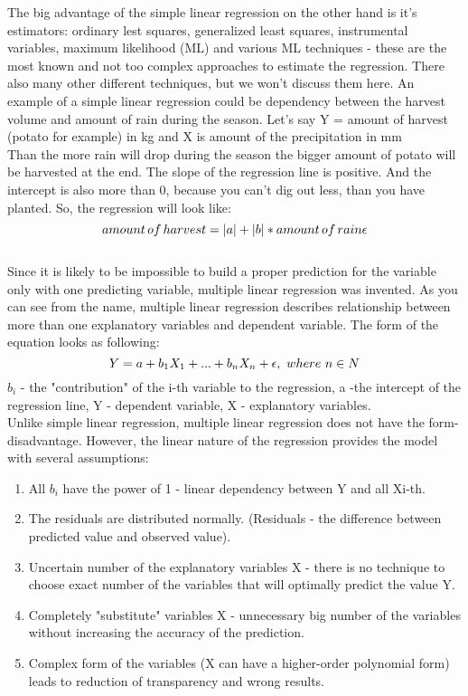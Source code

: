 \documentclass[12pt, a4paper]{article}
\begin{document}
The big advantage of the simple linear regression on the other hand is it's estimators: ordinary lest squares, generalized least squares, instrumental variables, maximum likelihood (ML) and various ML techniques - these are the most known and not too complex approaches to estimate the regression. There also many other different techniques, but we won't discuss them here. An example of a simple linear regression could be dependency between the harvest volume and amount of rain during the season. Let's say Y = amount of harvest (potato for example) in kg and X is amount of the precipitation in mm\\ Than the more rain will drop during the season the bigger amount of potato will be harvested at the end. The slope of the regression line is positive. And the intercept is also more than 0, because you can't dig out less, than you have planted. So, the regression will look like:
\[amount \thinspace of \thinspace harvest = |a| + |b|*amount \thinspace of \thinspace rain \epsilon\] \\
Since it is likely to be impossible to build a proper prediction for the variable only with one predicting variable, multiple linear regression was invented. As you can see from the name, multiple linear regression describes relationship between more than one explanatory variables and dependent variable. The form of the equation looks as following:\[ Y = a + b_{1}X_{1}+ ... + b_{n}X_{n} + \epsilon, \thinspace \thinspace where \thinspace \thinspace n \in N\]   
$b_{i}$ - the "contribution" of the i-th variable to the regression, a -the intercept of the regression line, Y - dependent variable, X - explanatory variables.\\
Unlike simple linear regression, multiple linear regression does not have the form-disadvantage. However, the linear nature of the regression provides the model with several assumptions:
\begin{enumerate}
	\item All $b_{i}$ have the power of 1 - linear dependency between Y and all Xi-th.
	\item The residuals are distributed normally. (Residuals - the difference between predicted value and observed value).
	\item Uncertain number of the explanatory variables X - there is no technique to choose exact number of the variables that will optimally predict the value Y.
	\item Completely "substitute" variables X - unnecessary big number of the variables without increasing the accuracy of the prediction.
	\item Complex form of the variables (X can have a higher-order polynomial form) leads to reduction of transparency and wrong results. 
\end{enumerate}
\end{document}
